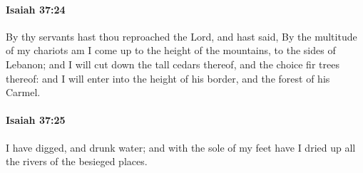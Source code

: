 		\paragraph{Isaiah 37:24} %
			\label{ISAIAH-37-24}

			By thy servants hast thou reproached the Lord, and hast said, By the multitude of my chariots am I come up to the height of the mountains, to the sides of Lebanon; and I will cut down the tall cedars thereof, and the choice fir trees thereof: and I will enter into the height of his border, and the forest of his Carmel.


		\paragraph{Isaiah 37:25} %
			\label{ISAIAH-37-25}

			I have digged, and drunk water; and with the sole of my feet have I dried up all the rivers of the besieged places.

